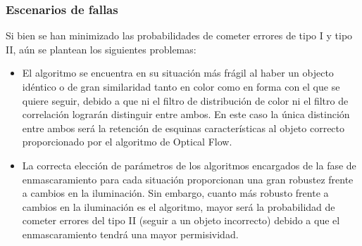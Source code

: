 \subsubsection{Escenarios de fallas}
Si bien se han minimizado las probabilidades de cometer errores de tipo I y tipo II, aún se plantean los siguientes problemas:
\begin{itemize}
\item El algoritmo se encuentra en su situación más frágil al haber un objecto idéntico o de gran similaridad tanto en color como en forma con el que se quiere seguir, debido a que ni el filtro de distribución de color ni el filtro de correlación lograrán distinguir entre ambos. En este caso la única distinción entre ambos será la retención de esquinas características al objeto correcto proporcionado por el algoritmo de Optical Flow. 
\item La correcta elección de parámetros de los algoritmos encargados de la fase de enmascaramiento para cada situación proporcionan una gran robustez frente a cambios en la iluminación. Sin embargo, cuanto más robusto frente a cambios en la iluminación es el algoritmo, mayor será la probabilidad de cometer errores del tipo II (seguir a un objeto incorrecto) debido a que el enmascaramiento tendrá una mayor permisividad. 
\end{itemize}



